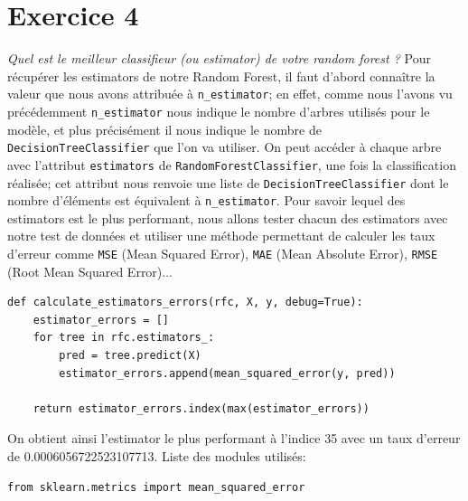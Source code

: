 \documentclass[a4paper, 12pt, oneside]{book}
\begin{document}
\section{Exercice 4}
\textit{Quel est le meilleur classifieur (ou estimator) de votre random forest ?}
\newline \newline
Pour récupérer les estimators de notre Random Forest, il faut d'abord connaître la valeur que nous avons attribuée à \texttt{n\_estimator}; en effet, comme nous l'avons vu précédemment \texttt{n\_estimator} nous indique le nombre d'arbres utilisés pour le modèle, et plus précisément il nous indique le nombre de \texttt{DecisionTreeClassifier} que l'on va utiliser. On peut accéder à chaque arbre avec l'attribut \texttt{estimators} de \texttt{RandomForestClassifier}, une fois la classification réalisée; cet attribut nous renvoie une liste de \texttt{DecisionTreeClassifier} dont le nombre d'éléments est équivalent à \texttt{n\_estimator}. Pour savoir lequel des estimators est le plus performant, nous allons tester chacun des estimators avec notre test de données et utiliser une méthode permettant de calculer les taux d'erreur comme \texttt{MSE} (Mean Squared Error), \texttt{MAE} (Mean Absolute Error), \texttt{RMSE} (Root Mean Squared Error)...
\begin{verbatim}
def calculate_estimators_errors(rfc, X, y, debug=True):
    estimator_errors = []
    for tree in rfc.estimators_:
        pred = tree.predict(X)
        estimator_errors.append(mean_squared_error(y, pred))

    return estimator_errors.index(max(estimator_errors))
\end{verbatim}
On obtient ainsi l'estimator le plus performant à l'indice 35 avec un taux d'erreur de 0.0006056722523107713.
\newline \newline
Liste des modules utilisés:
\begin{verbatim}
from sklearn.metrics import mean_squared_error
\end{verbatim}
\end{document}
